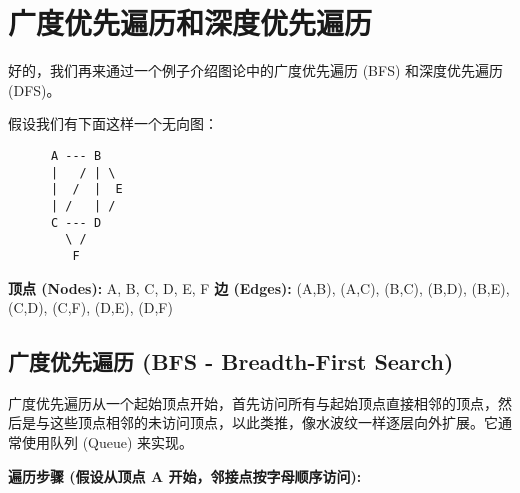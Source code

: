 \section{广度优先遍历和深度优先遍历}

好的，我们再来通过一个例子介绍图论中的广度优先遍历 (BFS) 和深度优先遍历 (DFS)。

假设我们有下面这样一个无向图：

\begin{lstlisting}
      A --- B
      |   / | \
      |  /  |  E
      | /   | /
      C --- D
        \ /
         F
\end{lstlisting}
\textbf{顶点 (Nodes):} A, B, C, D, E, F
\textbf{边 (Edges):} (A,B), (A,C), (B,C), (B,D), (B,E), (C,D), (C,F), (D,E), (D,F)

\subsection{广度优先遍历 (BFS - Breadth-First Search)}

广度优先遍历从一个起始顶点开始，首先访问所有与起始顶点直接相邻的顶点，然后是与这些顶点相邻的未访问顶点，以此类推，像水波纹一样逐层向外扩展。它通常使用队列 (Queue) 来实现。

\textbf{遍历步骤 (假设从顶点 A 开始，邻接点按字母顺序访问):}


